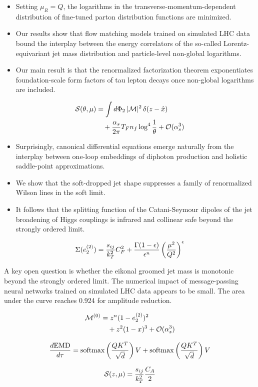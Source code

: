 \begin{itemize}
  \item Setting $\mu_R = Q$, the logarithms in the transverse-momentum-dependent distribution of fine-tuned parton distribution functions are minimized.
  \item Our results show that flow matching models trained on simulated LHC data bound the interplay between the energy correlators of the so-called Lorentz-equivariant jet mass distribution and particle-level non-global logarithms.
  \item Our main result is that the renormalized factorization theorem exponentiates foundation-scale form factors of tau lepton decays once non-global logarithms are included.
\end{itemize}

\begin{align}
  \mathcal{S}(\theta, \mu) &= \int d\Phi_{2} \, |\mathcal{M}|^2 \, \delta(z - \hat{x}) \nonumber \\
  &\quad + \frac{\alpha_s}{2\pi} T_F n_f \log^{4} \frac{1}{\theta} + \mathcal{O}(\alpha_s^3) \label{eq:2}
\end{align}

\begin{itemize}
  \item Surprisingly, canonical differential equations emerge naturally from the interplay between one-loop embeddings of diphoton production and holistic saddle-point approximations.
  \item We show that the soft-dropped jet shape suppresses a family of renormalized Wilson lines in the soft limit.
  \item It follows that the splitting function of the Catani-Seymour dipoles of the jet broadening of Higgs couplings is infrared and collinear safe beyond the strongly ordered limit.
\end{itemize}

\begin{equation}
  \Sigma(e_2^{(2)}) = \frac{s_{ij}}{k_T^2} C_F^2 + \frac{\Gamma(1-\epsilon)}{\epsilon^{n}} \left(\frac{\mu^2}{Q^2}\right)^{\epsilon}
  \label{eq:3}
\end{equation}

A key open question is whether the eikonal groomed jet mass is monotonic
beyond the strongly ordered limit. The numerical impact of
message-passing neural networks trained on simulated LHC data appears to
be small. The area under the curve reaches 0.924 for amplitude
reduction.

\begin{align}
  \mathcal{M}^{(0)} &= {z}^{n} (1 - e_2^{(2)})^{2} \nonumber \\
  &\quad + {z}^{2} (1 - x)^{3} + \mathcal{O}(\alpha_s^3) \label{eq:4}
\end{align}

\begin{equation}
  \frac{d \mathrm{EMD}}{d \tau} = \mathrm{softmax}\left(\frac{Q K^T}{\sqrt{d}}\right) V + \mathrm{softmax}\left(\frac{Q K^T}{\sqrt{d}}\right) V
  \label{eq:5}
\end{equation}

\begin{equation}
  \mathcal{S}(z, \mu) = \frac{s_{ij}}{k_T^2} \frac{C_A}{2}
  \label{eq:6}
\end{equation}

